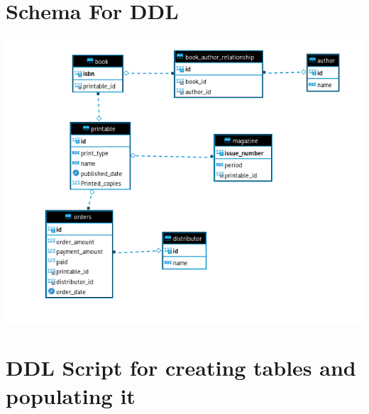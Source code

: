 \documentclass{article}
\begin{document}
\section{Schema For DDL}
\includegraphics{assets/erd.png}

\section{DDL Script for creating tables and populating it}
\end{document}
